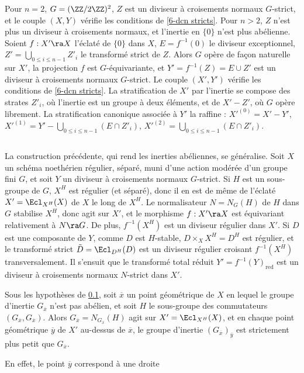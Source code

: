 \documentclass[10pt]{../fichiers-configuration-latex/smfart}
\begin{document}
Pour $n = 2$, $G = (\ZZ/2\ZZ)^2$, $Z$ est un diviseur à croisements normaux $G$-strict, et le couple
$(X,Y)$ vérifie les conditions de \ref{6-dcn stricts}. Pour $n > 2$, $Z$ n'est plus un diviseur à
croisements normaux, et l'inertie en $\{0\}$ n'est plus abélienne. Soient $f : X' \ra X$ l'éclaté de
$\{0\}$ dans $X$, $E = f^{-1}(0)$ le diviseur exceptionnel, $Z' = \bigcup_{0 \le i \le n-1}Z'_i$ le
transformé strict de $Z$. Alors $G$ opère de façon naturelle sur $X'$, la projection $f$ est
$G$-équivariante, et $Y' = f^{-1}(Z) = E \cup Z'$ est un diviseur à croisements normaux $G$-strict.
Le couple $(X',Y')$ vérifie les conditions de \ref{6-dcn stricts}. La stratification de $X'$ par
l'inertie se compose des strates $Z'_i$, où l'inertie est un groupe à deux éléments, et de $X'-Z'$,
où $G$ opère librement. La stratification canonique associée à $Y'$ la raffine : $X'^{(0)} = X' -
Y'$, $X'^{(1)} = Y' - \bigcup_{0 \le i \le n-1}(E \cap Z'_i)$, $X'^{(2)} = \bigcup_{0 \le i \le
n-1}(E \cap Z'_i)$.  \subsection{}\label{6-éclatements}\label{6-eclatements} La construction
précédente, qui rend les inerties abéliennes, se généralise. Soit $X$ un schéma noethérien régulier,
séparé, muni d'une action modérée d'un groupe fini $G$, et soit $Y$ un diviseur à croisements
normaux $G$-strict. Si $H$ est un sous-groupe de $G$, $X^H$ est régulier (et séparé), donc il en est
de même de l'éclaté $X' = \Ecl_{X^H}(X)$ de $X$ le long de $X^H$. Le normalisateur $N = N_G(H)$ de $H$
dans $G$ stabilise $X^H$, donc agit sur $X'$, et le morphisme $f : X' \ra X$ est équivariant
relativement à $N \ra G$. De plus, $f^{-1}(X^H)$ est un diviseur régulier dans $X'$. Si $D$ est une
composante de $Y$, comme $D$ est $H$-stable, $D \times_X X^H = D^H$ est régulier, et le transformé
strict $\tilde D = \Ecl_{D^H}(D)$ est un diviseur régulier croisant $f^{-1}(X^H)$ transversalement. Il
s'ensuit que le transformé total réduit $Y' = f^{-1}(Y)_{\mathrm{red}}$ est un diviseur à
croisements normaux $N$-strict dans $X'$.  \begin{proposition}\label{6-inerties abéliennes} Sous les
hypothèses de \ref{6-éclatements}, soit $\overline{x}$ un point géométrique de $X$ en lequel le
groupe d'inertie $G_{\overline{x}}$ n'est pas abélien, et soit $H$ le sous-groupe des commutateurs
$(G_{\overline{x}},G_{\overline{x}})$. Alors $G_{\overline{x}} = N_{G_{\overline{x}}}(H)$ agit sur
$X' = \Ecl_{X^H}(X)$, et en chaque point géométrique $\overline{y}$ de $X'$ au-dessus de
$\overline{x}$, le groupe d'inertie $(G_{\overline{x}})_{\overline{y}}$ est strictement plus petit
que $G_{\overline{x}}$.  \end{proposition} En effet, le point $\overline{y}$ correspond à une droite
\end{document}
